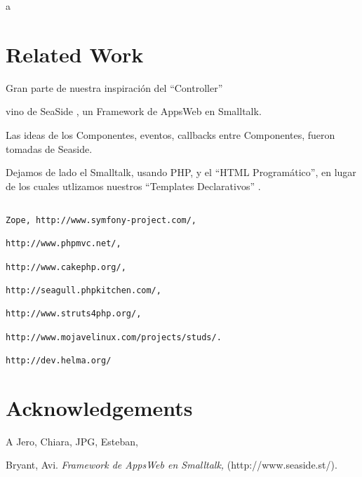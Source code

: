 a\section{Related Work}

Gran parte de nuestra inspiración del ``Controller''

vino de SeaSide \cite{seaside}, un Framework de AppsWeb en Smalltalk.

Las ideas de los Componentes, eventos, callbacks entre Componentes, fueron tomadas de Seaside.

Dejamos de lado el Smalltalk, usando PHP, y el ``HTML Programático'', en lugar de los cuales utlizamos nuestros ``Templates Declarativos'' .

\begin{verbatim}

Zope, http://www.symfony-project.com/,

http://www.phpmvc.net/,

http://www.cakephp.org/,

http://seagull.phpkitchen.com/,

http://www.struts4php.org/,

http://www.mojavelinux.com/projects/studs/.

http://dev.helma.org/
\end{verbatim}

\section{Acknowledgements}

A Jero, Chiara, JPG, Esteban,


\begin{thebibliography}{77}

 Bryant, Avi.
{\it Framework de AppsWeb en Smalltalk,} (http://www.seaside.st/).

\end{thebibliography}